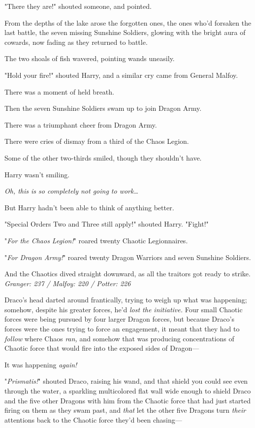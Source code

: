 "There they are!" shouted someone, and pointed.

From the depths of the lake arose the forgotten ones, the ones who'd forsaken
the last battle, the seven missing Sunshine Soldiers, glowing with the bright
aura of cowards, now fading as they returned to battle.

The two shoals of fish wavered, pointing wands uneasily.

"Hold your fire!" shouted Harry, and a similar cry came from General Malfoy.

There was a moment of held breath.

Then the seven Sunshine Soldiers swam up to join Dragon Army.

There was a triumphant cheer from Dragon Army.

There were cries of dismay from a third of the Chaos Legion.

Some of the other two-thirds smiled, though they shouldn't have.

Harry wasn't smiling.

\emph{Oh, this is so completely not going to work{\ldots}}

But Harry hadn't been able to think of anything better.

"Special Orders Two and Three still apply!" shouted Harry. "Fight!"

"\emph{For the Chaos Legion!}" roared twenty Chaotic Legionnaires.

"\emph{For Dragon Army!}" roared twenty Dragon Warriors and seven Sunshine
Soldiers.

And the Chaotics dived straight downward, as all the traitors got ready to
strike.
\later
\emph{Granger: 237 / Malfoy: 220 / Potter: 226}

Draco's head darted around frantically, trying to weigh up what was happening;
somehow, despite his greater forces, he'd \emph{lost the initiative.} Four
small Chaotic forces were being pursued by four larger Dragon forces, but
because Draco's forces were the ones trying to force an engagement, it meant
that they had to \emph{follow} where Chaos \emph{ran,} and somehow that was
producing concentrations of Chaotic force that would fire into the exposed
sides of Dragon---

It was happening \emph{again!}

"\emph{Prismatis!}" shouted Draco, raising his wand, and that shield you could
see even through the water, a sparkling multicolored flat wall wide enough to
shield Draco and the five other Dragons with him from the Chaotic force that
had just started firing on them as they swam past, and \emph{that} let the
other five Dragons turn \emph{their} attentions back to the Chaotic force
they'd been chasing---

